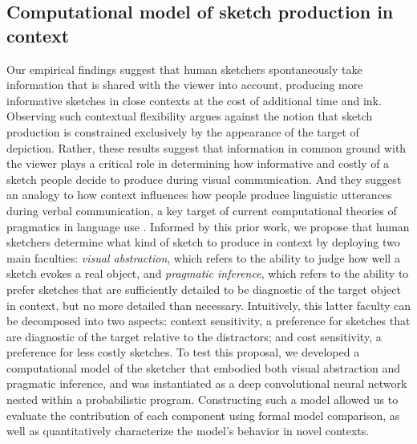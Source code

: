 \documentclass[9pt,twocolumn,twoside]{pnas-new}
\begin{document}





\subsection*{Computational model of sketch production in context}

Our empirical findings suggest that human sketchers spontaneously take information that is shared with the viewer into account, producing more informative sketches in close contexts at the cost of additional time and ink. 
Observing such contextual flexibility argues against the notion that sketch production is constrained exclusively by the appearance of the target of depiction. 
Rather, these results suggest that information in common ground with the viewer plays a critical role in determining how informative and costly of a sketch people decide to produce during visual communication. 
And they suggest an analogy to how context influences how people produce linguistic utterances during verbal communication, a key target of current computational theories of pragmatics in language use \cite{frank2012predicting,goodman2013knowledge,franke2016probabilistic,bergen2016pragmatic}.
Informed by this prior work, we propose that human sketchers determine what kind of sketch to produce in context by deploying two main faculties: \textit{visual abstraction}, which refers to the ability to judge how well a sketch evokes a real object, and \textit{pragmatic inference}, which refers to the ability to prefer sketches that are sufficiently detailed to be diagnostic of the target object in context, but no more detailed than necessary. 
Intuitively, this latter faculty can be decomposed into two aspects: context sensitivity, a preference for sketches that are diagnostic of the target relative to the distractors; and cost sensitivity, a preference for less costly sketches. 
To test this proposal, we developed a computational model of the sketcher that embodied both visual abstraction and pragmatic inference, and was instantiated as a deep convolutional neural network nested within a probabilistic program. 
Constructing such a model allowed us to evaluate the contribution of each component using formal model comparison, as well as quantitatively characterize the model's behavior in novel contexts.
\end{document}
